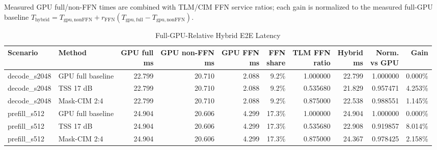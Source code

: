 \documentclass[10pt]{article}
\begin{document}
\begin{table}[!ht]
\caption{Full-GPU-Relative Hybrid E2E Latency}
\footnotesize
Measured GPU full/non-FFN times are combined with TLM/CIM FFN service ratios;
each gain is normalized to the measured full-GPU baseline
\(T_{\mathrm{hybrid}} =
T_{\mathrm{gpu,nonFFN}} +
r_{\mathrm{FFN}}(T_{\mathrm{gpu,full}}-T_{\mathrm{gpu,nonFFN}})\).
\begin{tabular*}{\textwidth}{@{\extracolsep{\fill}}llrrrrrrrr}
\toprule
Scenario & Method & \makecell[r]{GPU full\\ms} & \makecell[r]{GPU non-FFN\\ms} &
\makecell[r]{GPU FFN\\ms} & \makecell[r]{FFN\\share} & \makecell[r]{TLM FFN\\ratio} &
\makecell[r]{Hybrid\\ms} & \makecell[r]{Norm.\\vs GPU} & Gain \\
\midrule
decode\_s2048 & GPU full baseline & 22.799 & 20.710 & 2.088 & 9.2\% & 1.000000 & 22.799 & 1.000000 & 0.000\% \\
decode\_s2048 & TSS 17 dB & 22.799 & 20.710 & 2.088 & 9.2\% & 0.535680 & 21.829 & 0.957471 & 4.253\% \\
decode\_s2048 & Mask-CIM 2:4 & 22.799 & 20.710 & 2.088 & 9.2\% & 0.875000 & 22.538 & 0.988551 & 1.145\% \\
prefill\_s512 & GPU full baseline & 24.904 & 20.606 & 4.299 & 17.3\% & 1.000000 & 24.904 & 1.000000 & 0.000\% \\
prefill\_s512 & TSS 17 dB & 24.904 & 20.606 & 4.299 & 17.3\% & 0.535680 & 22.908 & 0.919857 & 8.014\% \\
prefill\_s512 & Mask-CIM 2:4 & 24.904 & 20.606 & 4.299 & 17.3\% & 0.875000 & 24.367 & 0.978425 & 2.158\% \\
\bottomrule
\end{tabular*}
\end{table}
\end{document}
